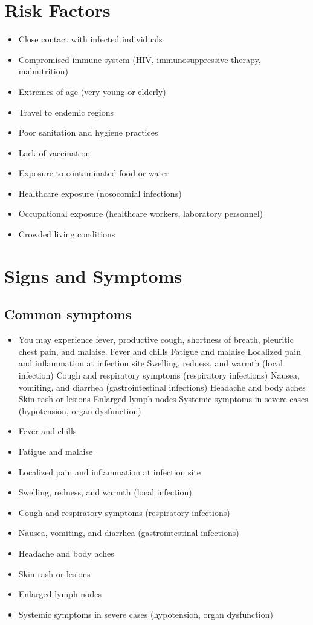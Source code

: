 \section{Risk Factors}

\begin{itemize}[noitemsep]
  \item Close contact with infected individuals
  \item Compromised immune system (HIV, immunosuppressive therapy, malnutrition)
  \item Extremes of age (very young or elderly)
  \item Travel to endemic regions
  \item Poor sanitation and hygiene practices
  \item Lack of vaccination
  \item Exposure to contaminated food or water
  \item Healthcare exposure (nosocomial infections)
  \item Occupational exposure (healthcare workers, laboratory personnel)
  \item Crowded living conditions
\end{itemize}
\section{Signs and Symptoms}

\subsection{Common symptoms}
\begin{itemize}[noitemsep]
  \item You may experience fever, productive cough, shortness of breath, pleuritic chest pain, and malaise. Fever and chills Fatigue and malaise Localized pain and inflammation at infection site Swelling, redness, and warmth (local infection) Cough and respiratory symptoms (respiratory infections) Nausea, vomiting, and diarrhea (gastrointestinal infections) Headache and body aches Skin rash or lesions Enlarged lymph nodes Systemic symptoms in severe cases (hypotension, organ dysfunction)
  \item Fever and chills
  \item Fatigue and malaise
  \item Localized pain and inflammation at infection site
  \item Swelling, redness, and warmth (local infection)
  \item Cough and respiratory symptoms (respiratory infections)
  \item Nausea, vomiting, and diarrhea (gastrointestinal infections)
  \item Headache and body aches
  \item Skin rash or lesions
  \item Enlarged lymph nodes
  \item Systemic symptoms in severe cases (hypotension, organ dysfunction)
\end{itemize}

